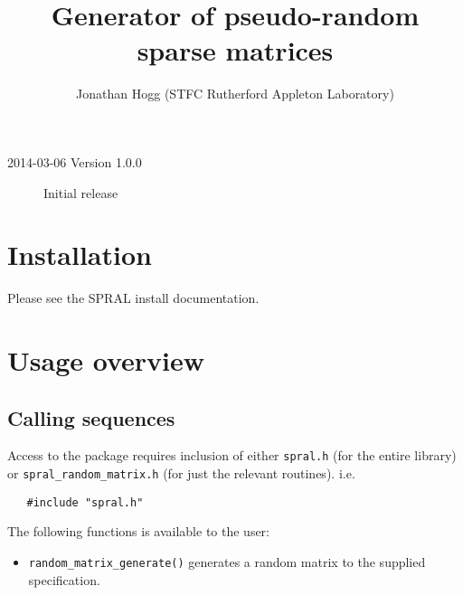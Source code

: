 
\title{Generator of pseudo-random sparse matrices}
\author{Jonathan Hogg (STFC Rutherford Appleton Laboratory)}
\spralmaketitle
\thispagestyle{firststyle}

\versionhistory
\begin{description}
\item[2014-03-06 Version 1.0.0] Initial release
\end{description}


\section{Installation}
Please see the SPRAL install documentation.


\section{Usage overview}

\subsection{Calling sequences}

Access to the package requires inclusion of either \texttt{spral.h} (for the
entire \spral library) or \texttt{spral\_random\_matrix.h} (for just the relevant routines). i.e.

\begin{verbatim}
   #include "spral.h"
\end{verbatim}

\noindent
The following functions is available to the user:
\begin{itemize}
   \item {\tt random\_matrix\_generate()} generates a random matrix to the
      supplied specification.
\end{itemize}

